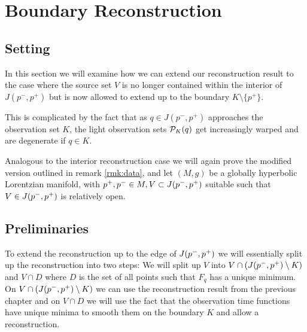 \chapter{Boundary Reconstruction}\label{chap:boundary}

\section{Setting}

In this section we will examine how we can extend our reconstruction result to the case where the source set $V$ is no longer contained within the interior of $J(p^-,p^+)$ but is now allowed to extend up to the boundary $K \setminus \{p^+\}$. 

This is complicated by the fact that as $q\in J(p^-,p^+)$ approaches the observation set $K$, the light observation sets ${\mathcal{P}}_K(q)$ get increasingly warped and are degenerate if $q\in K$. 

Analogous to the interior reconstruction case we will again prove the modified version outlined in remark \ref{rmk:data}, and let $(M,g)$ be a globally hyperbolic Lorentzian manifold, with $p^+,p^-\in M,V\subset J(p^-,p^+)$ suitable such that $V\in J(p^-,p^+)$ is relatively open.

\section{Preliminaries}
To extend the reconstruction up to the edge of $J(p^-,p^+)$ we will essentially split up the reconstruction into two steps: We will split up $V$ into $V\cap (J(p^-,p^+) \setminus K)$ and $V\cap D$ where $D$ is the set of all points such that $F_q$ has a unique minimum. On $V\cap (J(p^-,p^+) \setminus K)$ we can use the reconstruction result from the previous chapter and on $V\cap D$ we will use the fact that the observation time functions have unique minima to smooth them on the boundary $K$ and allow a reconstruction.

